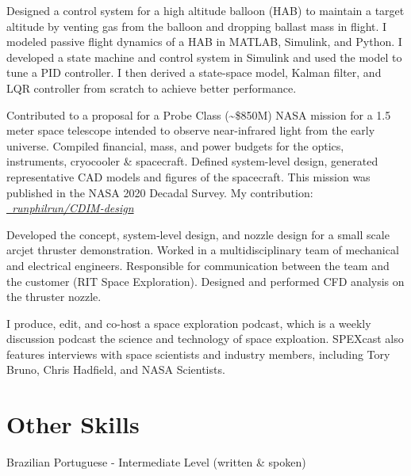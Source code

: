 \documentclass[10pt,final,sans]{resume}
\begin{document}
Designed a control system for a high altitude balloon (HAB)
to maintain a target altitude by venting gas from the balloon and dropping
ballast mass in flight. I modeled passive flight dynamics of a HAB in MATLAB,
Simulink, and Python. I developed a state machine and control system in
Simulink and used the model to tune a PID controller. I then derived a
state-space model, Kalman filter, and LQR controller from scratch to achieve
better performance.

Contributed to a proposal for a Probe Class (\textasciitilde\$850M) NASA mission
for a 1.5 meter space telescope intended to observe near-infrared light from the
early universe. Compiled financial, mass, and power budgets for the optics,
instruments, cryocooler \& spacecraft. Defined system-level design, generated
representative CAD models and figures of the spacecraft. This mission was
published in the NASA 2020 Decadal Survey. My contribution: \href{https://github.com/runphilrun/CDIM-design/blob/master/cdim_design.pdf}{\it \faGithub\ runphilrun/CDIM-design}

Developed the concept, system-level design, and nozzle design for a small scale
arcjet thruster demonstration. Worked in a multidisciplinary team of mechanical
and electrical engineers. Responsible for communication between the team and the
customer (RIT Space Exploration). Designed and performed CFD analysis on the
thruster nozzle.

I produce, edit, and co-host a space exploration podcast, which is a weekly
discussion podcast the science and technology of space exploation. SPEXcast
also features interviews with space scientists and industry members, including
Tory Bruno, Chris Hadfield, and NASA Scientists.

\section{Other Skills}
Brazilian Portuguese - Intermediate Level (written \& spoken)
\end{document}
